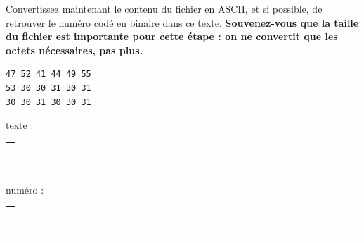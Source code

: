 \documentclass[11pt,a4paper]{article}
\begin{document}
\smallskip

Convertissez maintenant le contenu du fichier en ASCII, et si possible, de retrouver le numéro codé en binaire dans ce texte.
\textbf{Souvenez-vous que la taille du fichier est importante pour cette étape : on ne convertit que les octets nécessaires, pas plus.}

\bigskip

\begin{table}[ht!]
  \centering
  \begin{minipage}{0.3\textwidth}
    \centering

\begin{lstlisting}[style=algorithmique]
47 52 41 44 49 55
53 30 30 31 30 31
30 30 31 30 30 31
\end{lstlisting}

  \end{minipage}
  \hfillx
  \begin{minipage}{0.3\textwidth}
    \centering

texte :

\medskip

\begin{tabular}{ | m{3.5cm} | }
\hline
 \\ \\ \\ \\ \\ \\ \\ \\
\hline
\end{tabular}

  \end{minipage}
  \hfillx
  \begin{minipage}{0.3\textwidth}
    \centering

numéro :

\medskip

\begin{tabular}{ | m{3.5cm} | }
\hline
 \\ \\ \\ \\ \\ \\ \\ \\
\hline
\end{tabular}

  \end{minipage}
\end{table}

\bigskip
\end{document}
